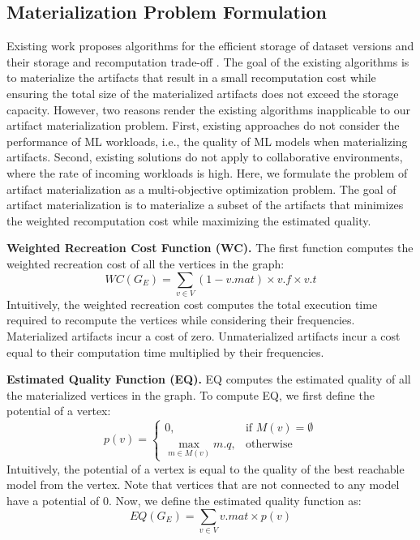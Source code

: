 \subsection{Materialization Problem Formulation}\label{subsec-materialization-problem}
Existing work proposes algorithms for the efficient storage of dataset versions and their storage and recomputation trade-off \cite{bhattacherjee2015principles}.
The goal of the existing algorithms is to materialize the artifacts that result in a small recomputation cost while ensuring the total size of the materialized artifacts does not exceed the storage capacity.
However, two reasons render the existing algorithms inapplicable to our artifact materialization problem.
First, existing approaches do not consider the performance of ML workloads, i.e., the quality of ML models when materializing artifacts.
Second, existing solutions do not apply to collaborative environments, where the rate of incoming workloads is high.
Here, we formulate the problem of artifact materialization as a multi-objective optimization problem.
The goal of artifact materialization is to materialize a subset of the artifacts that minimizes the weighted recomputation cost while maximizing the estimated quality.

\textbf{Weighted Recreation Cost Function (WC).} 
The first function computes the weighted recreation cost of all the vertices in the graph:
\[
WC(G_E) =  \sum\limits_{v \in V}  (1-v.mat) \times v.f \times v.t
\]
Intuitively, the weighted recreation cost computes the total execution time required to recompute the vertices while considering their frequencies.
Materialized artifacts incur a cost of zero.
Unmaterialized artifacts incur a cost equal to their computation time multiplied by their frequencies.

\textbf{Estimated Quality Function (EQ).} 
EQ computes the estimated quality of all the materialized vertices in the graph.
To compute EQ, we first define the potential of a vertex:
\[
p(v) =  
		\begin{cases}
		0 , & \text{if }M(v) = \emptyset  \\
		\max\limits_{m \in M(v)} m.q, & \text{otherwise}
		\end{cases}
\]
Intuitively, the potential of a vertex is equal to the quality of the best reachable model from the vertex.
Note that vertices that are not connected to any model have a potential of 0.
Now, we define the estimated quality function as:
\[
EQ(G_E) =  \sum\limits_{v \in V}  v.mat \times p(v)
\]

